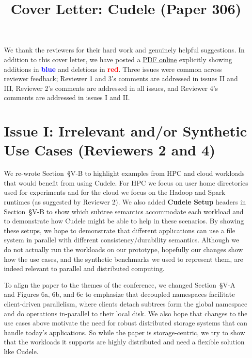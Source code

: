 \documentclass[onecolumn,conference]{IEEEtran}
\begin{document}
\title{Cover Letter: Cudele (Paper 306)}
\maketitle

We thank the reviewers for their hard work and genuinely helpful suggestions.
In addition to this cover letter, we have posted a
\href{https://github.com/michaelsevilla/cudele-popper/blob/master/paper/diff.pdf}{PDF
online} explicitly showing additions in \textcolor{blue}{\textbf{blue}} and
deletions in \textcolor{red}{\textbf{red}}. Three issues were common across
reviewer feedback; Reviewer 1 and 3's comments are addressed in issues II and
III, Reviewer 2's comments are addressed in all issues, and Reviewer 4's
comments are addressed in issues I and II.  

\section*{Issue I: Irrelevant and/or Synthetic Use Cases (Reviewers 2 and 4)}

We re-wrote Section~{\S}V-B to highlight examples from HPC and cloud workloads
that would benefit from using Cudele. For HPC we focus on user home directories
used for experiments and for the cloud we focus on the Hadoop and Spark
runtimes (as suggested by Reviewer 2).  We also added \textbf{Cudele Setup}
headers in Section~{\S}V-B to show which subtree semantics accommodate each
workload and to demonstrate how Cudele might be able to help in these
scenarios.  By showing these setups, we hope to demonstrate that different
applications can use a file system in parallel with different
consistency/durability semantics.  Although we do not actually run the
workloads on our prototype, hopefully our changes show how the use cases, and
the synthetic benchmarks we used to represent them, are indeed relevant to
parallel and distributed computing.

To align the paper to the themes of the conference, we changed Section~{\S}V-A
and Figures 6a, 6b, and 6c to emphasize that decoupled namespaces facilitate
client-driven parallelism, where clients detach subtrees form the global namespace
and do operations in-parallel to their local disk. We also hope that changes to
the use cases above motivate the need for robust distributed storage systems
that can handle today's applications.  So while the paper is storage-centric,
we try to show that the workloads it supports are highly distributed and need a
flexible solution like Cudele.  
\end{document}
